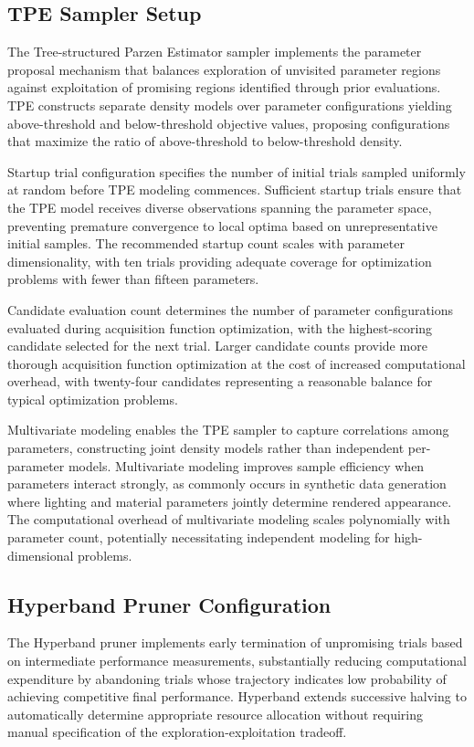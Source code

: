 \subsection{TPE Sampler Setup}

The Tree-structured Parzen Estimator sampler implements the parameter proposal mechanism that balances exploration of unvisited parameter regions against exploitation of promising regions identified through prior evaluations. TPE constructs separate density models over parameter configurations yielding above-threshold and below-threshold objective values, proposing configurations that maximize the ratio of above-threshold to below-threshold density.

Startup trial configuration specifies the number of initial trials sampled uniformly at random before TPE modeling commences. Sufficient startup trials ensure that the TPE model receives diverse observations spanning the parameter space, preventing premature convergence to local optima based on unrepresentative initial samples. The recommended startup count scales with parameter dimensionality, with ten trials providing adequate coverage for optimization problems with fewer than fifteen parameters.

Candidate evaluation count determines the number of parameter configurations evaluated during acquisition function optimization, with the highest-scoring candidate selected for the next trial. Larger candidate counts provide more thorough acquisition function optimization at the cost of increased computational overhead, with twenty-four candidates representing a reasonable balance for typical optimization problems.

Multivariate modeling enables the TPE sampler to capture correlations among parameters, constructing joint density models rather than independent per-parameter models. Multivariate modeling improves sample efficiency when parameters interact strongly, as commonly occurs in synthetic data generation where lighting and material parameters jointly determine rendered appearance. The computational overhead of multivariate modeling scales polynomially with parameter count, potentially necessitating independent modeling for high-dimensional problems.

\subsection{Hyperband Pruner Configuration}

The Hyperband pruner implements early termination of unpromising trials based on intermediate performance measurements, substantially reducing computational expenditure by abandoning trials whose trajectory indicates low probability of achieving competitive final performance. Hyperband extends successive halving to automatically determine appropriate resource allocation without requiring manual specification of the exploration-exploitation tradeoff.

